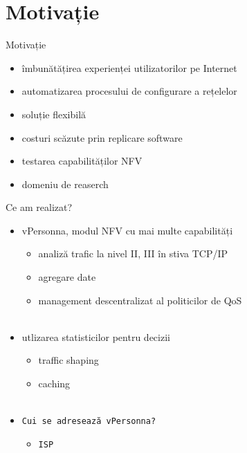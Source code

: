 \documentclass{beamer}
\begin{document}
\section{Motivație}
\begin{frame}{Motivație}
	\pause
	\begin{itemize} [<+->]
		\item îmbunătățirea experienței utilizatorilor pe Internet
		\item automatizarea procesului de configurare a rețelelor
		\item soluție flexibilă
		\item costuri scăzute prin replicare software
		\item testarea capabilităților NFV
		\item domeniu de reaserch
	\end{itemize}
\end{frame}

\begin{frame}{Ce am realizat?}
\pause
\begin{itemize} [<+->]
	\item {vPersonna, modul NFV cu mai multe capabilități
		\begin{itemize} [<+->]
				\item analiză trafic la nivel II, III în stiva TCP/IP
				\item agregare date
				\item management descentralizat al politicilor de QoS	\\~\\
		\end{itemize}
	}
	
	\item { utlizarea statisticilor pentru decizii
		\begin{itemize} [<+->]
				\item traffic shaping
				\item caching   \\~\\
		\end{itemize}
	}
	\item [] {
		\begin{beamerboxesrounded}[lower=block body,shadow=true]{}
			\texttt{Cui se adresează vPersonna? }
			\begin{itemize}
				\item \texttt{ISP}
			\end{itemize}
		\end{beamerboxesrounded}
	}
	\end{itemize}
	
\end{frame}
\end{document}
